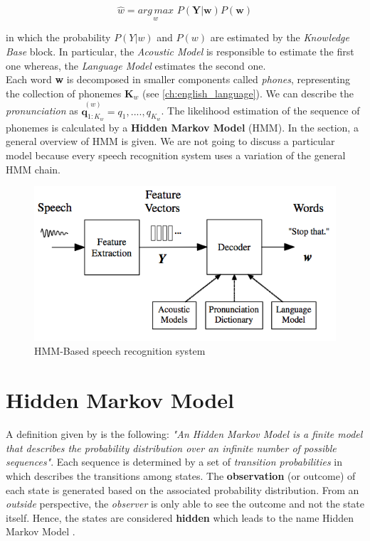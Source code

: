 \begin{equation}
	\widehat{w} = \underset{w}{arg \, max} \,\, P (\textbf{Y}|\textbf{w}) P(\textbf{w})
\end{equation}

\noindent in which the probability $P(Y|w)$ and $P(w)$ are estimated by the \textit{Knowledge Base} block. In particular, the \textit{Acoustic Model} is responsible to estimate the first one whereas, the \textit{Language Model} estimates the second one. \\
\noindent Each word \textbf{w} is decomposed in smaller components called \textit{phones}, representing the collection of phonemes $\textbf{K}_{w}$ (see \ref{ch:english_language}). We can describe the \textit{pronunciation} as $\overset{(w)}{\textbf{q}_{1:K_{w}}} = q_{1}, ...., q_{K_{w}}$. The likelihood estimation of the sequence of phonemes is calculated by a \textbf{Hidden Markov Model} (HMM). In the section, a general overview of HMM is given. We are not going to discuss a particular model because every speech recognition system uses a variation of the general HMM chain. \\

\begin{figure}[!ht]
	\centering
	\includegraphics[scale=0.8]{Figures/speech_Architecture.png}
	\caption{HMM-Based speech recognition system \cite{gales2008application}}
	\label{fig:speech_architecture}
\end{figure}

\section{Hidden Markov Model}
\label{sec:hmm}
\noindent A definition given by \cite{eddy1996hidden} is the following: \textit{"An Hidden Markov Model is a finite model that describes the probability distribution over an infinite number of possible sequences"}. Each sequence is determined by a set of \textit{transition probabilities} in which describes the transitions among states. The \textbf{observation} (or outcome) of each state is generated based on the associated probability distribution. From an \textit{outside} perspective, the \textit{observer} is only able to see the outcome and not the state itself. Hence, the states are considered \textbf{hidden} which leads to the name Hidden Markov Model \cite{def_hmm}. \\

